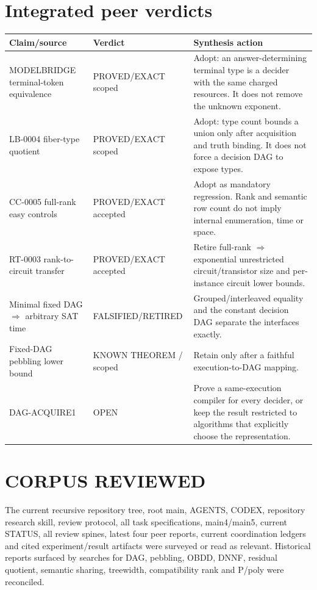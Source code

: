 \documentclass[11pt]{article}
\begin{document}
\section{Integrated peer verdicts}
\begin{longtable}{p{}p{}p{}}
\toprule Claim/source&Verdict&Synthesis action\\\midrule\endhead
MODELBRIDGE terminal-token equivalence
&PROVED/EXACT scoped&Adopt: an answer-determining terminal type is a decider
with the same charged resources.  It does not remove the unknown exponent.\\
LB-0004 fiber-type quotient
&PROVED/EXACT scoped&Adopt: type count bounds a union only after acquisition
and truth binding.  It does not force a decision DAG to expose types.\\
CC-0005 full-rank easy controls
&PROVED/EXACT accepted&Adopt as mandatory regression.  Rank and semantic row
count do not imply internal enumeration, time or space.\\
RT-0003 rank-to-circuit transfer
&PROVED/EXACT accepted&Retire full-rank $\Rightarrow$ exponential unrestricted
circuit/transistor size and per-instance circuit lower bounds.\\
Minimal fixed DAG $\Rightarrow$ arbitrary SAT time
&FALSIFIED/RETIRED&Grouped/interleaved equality and the constant decision DAG
separate the interfaces exactly.\\
Fixed-DAG pebbling lower bound
&KNOWN THEOREM / scoped&Retain only after a faithful execution-to-DAG mapping.\\
\textsf{DAG-ACQUIRE1}
&OPEN&Prove a same-execution compiler for every decider, or keep the result
restricted to algorithms that explicitly choose the representation.\\
\bottomrule
\end{longtable}

\section{CORPUS REVIEWED}
The current recursive repository tree, root main, AGENTS, CODEX, repository
research skill, review protocol, all task specifications, main4/main5,
current STATUS, all review spines, latest four peer reports, current
coordination ledgers and cited experiment/result artifacts were surveyed or
read as relevant.  Historical reports surfaced by searches for DAG,
pebbling, OBDD, DNNF, residual quotient, semantic sharing, treewidth,
compatibility rank and P/poly were reconciled.
\end{document}
